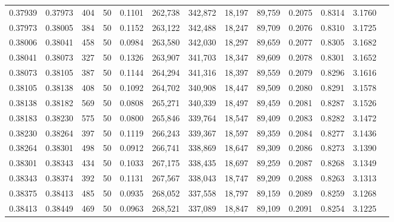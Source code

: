 \begin{tabular}{rrrrrrrrrrrrr}
0.37939 & 0.37973 &   404 &  50 &                                     0.1101 & 262,738 & 342,872 &  18,197 &  89,759 & 0.2075 & 0.8314 & 3.1760 \\
0.37973 & 0.38005 &   384 &  50 &                                     0.1152 & 263,122 & 342,488 &  18,247 &  89,709 & 0.2076 & 0.8310 & 3.1725 \\
0.38006 & 0.38041 &   458 &  50 &                                     0.0984 & 263,580 & 342,030 &  18,297 &  89,659 & 0.2077 & 0.8305 & 3.1682 \\
0.38041 & 0.38073 &   327 &  50 &                                     0.1326 & 263,907 & 341,703 &  18,347 &  89,609 & 0.2078 & 0.8301 & 3.1652 \\
0.38073 & 0.38105 &   387 &  50 &                                     0.1144 & 264,294 & 341,316 &  18,397 &  89,559 & 0.2079 & 0.8296 & 3.1616 \\
0.38105 & 0.38138 &   408 &  50 &                                     0.1092 & 264,702 & 340,908 &  18,447 &  89,509 & 0.2080 & 0.8291 & 3.1578 \\
0.38138 & 0.38182 &   569 &  50 &                                     0.0808 & 265,271 & 340,339 &  18,497 &  89,459 & 0.2081 & 0.8287 & 3.1526 \\
0.38183 & 0.38230 &   575 &  50 &                                     0.0800 & 265,846 & 339,764 &  18,547 &  89,409 & 0.2083 & 0.8282 & 3.1472 \\
0.38230 & 0.38264 &   397 &  50 &                                     0.1119 & 266,243 & 339,367 &  18,597 &  89,359 & 0.2084 & 0.8277 & 3.1436 \\
0.38264 & 0.38301 &   498 &  50 &                                     0.0912 & 266,741 & 338,869 &  18,647 &  89,309 & 0.2086 & 0.8273 & 3.1390 \\
0.38301 & 0.38343 &   434 &  50 &                                     0.1033 & 267,175 & 338,435 &  18,697 &  89,259 & 0.2087 & 0.8268 & 3.1349 \\
0.38343 & 0.38374 &   392 &  50 &                                     0.1131 & 267,567 & 338,043 &  18,747 &  89,209 & 0.2088 & 0.8263 & 3.1313 \\
0.38375 & 0.38413 &   485 &  50 &                                     0.0935 & 268,052 & 337,558 &  18,797 &  89,159 & 0.2089 & 0.8259 & 3.1268 \\
0.38413 & 0.38449 &   469 &  50 &                                     0.0963 & 268,521 & 337,089 &  18,847 &  89,109 & 0.2091 & 0.8254 & 3.1225 \\

\end{tabular}
